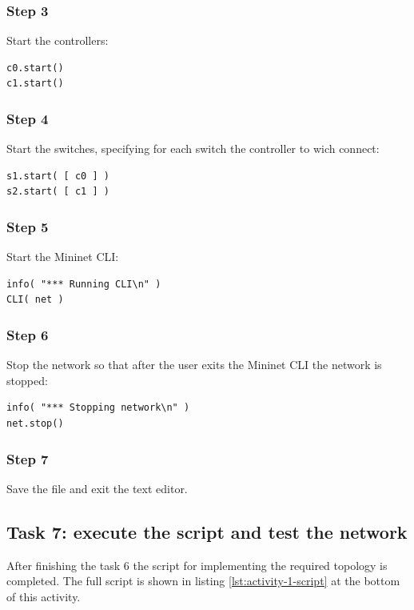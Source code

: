\subsubsection*{Step 3}
Start the controllers:
\begin{lstlisting}
c0.start()
c1.start()
\end{lstlisting}

\subsubsection*{Step 4}
Start the switches, specifying for each switch the controller to wich connect:
\begin{lstlisting}
s1.start( [ c0 ] )
s2.start( [ c1 ] )
\end{lstlisting}

\subsubsection*{Step 5}
Start the Mininet CLI:
\begin{lstlisting}
info( "*** Running CLI\n" )
CLI( net )
\end{lstlisting}

\subsubsection*{Step 6}
Stop the network so that after the user exits the Mininet CLI the network is
stopped:
\begin{lstlisting}
info( "*** Stopping network\n" )
net.stop()
\end{lstlisting}

\subsubsection*{Step 7}
Save the file and exit the text editor.




\subsection*{Task 7: execute the script and test the network}
After finishing the task 6 the script for implementing the required topology is
completed. The full script is shown in listing \ref{lst:activity-1-script} at the
bottom of this activity.

